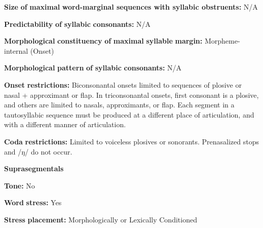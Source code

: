 \documentclass[output=paper]{langsci/langscibook}
\begin{document}
\begin{styleBody}
\textbf{Size} \textbf{of} \textbf{maximal} \textbf{word{}-marginal sequences with syllabic obstruents:} N/A
\end{styleBody}

\begin{styleBody}
\textbf{Predictability} \textbf{of} \textbf{syllabic} \textbf{consonants:} N/A 
\end{styleBody}

\begin{styleBody}
\textbf{Morphological} \textbf{constituency} \textbf{of} \textbf{maximal} \textbf{syllable} \textbf{margin:} Morpheme-internal (Onset)
\end{styleBody}

\begin{styleBody}
\textbf{Morphological} \textbf{pattern} \textbf{of} \textbf{syllabic} \textbf{consonants:} N/A
\end{styleBody}

\begin{styleBody}
\textbf{Onset} \textbf{restrictions:} Biconsonantal onsets limited to sequences of plosive or nasal + approximant or flap. In triconsonantal onsets, first consonant is a plosive, and others are limited to nasals, approximants, or flap. Each segment in a tautosyllabic sequence must be produced at a different place of articulation, and with a different manner of articulation.
\end{styleBody}

\begin{styleBody}
\textbf{Coda} \textbf{restrictions:} Limited to voiceless plosives or sonorants. Prenasalized stops and /ŋ/ do not occur.
\end{styleBody}

\begin{styleBody}
\textbf{Suprasegmentals}
\end{styleBody}

\begin{styleBody}
\textbf{Tone:} No
\end{styleBody}

\begin{styleBody}
\textbf{Word} \textbf{stress:} Yes
\end{styleBody}

\begin{styleBody}
\textbf{Stress} \textbf{placement:} Morphologically or Lexically Conditioned
\end{styleBody}
\end{document}
